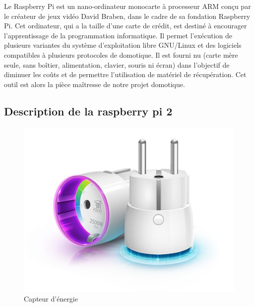 Le Raspberry Pi est un nano-ordinateur monocarte à processeur ARM conçu par le créateur de jeux vidéo David Braben, dans le cadre de sa fondation Raspberry Pi. Cet ordinateur, qui a la taille d'une carte de crédit, est destiné à encourager l'apprentissage de la programmation informatique. Il permet l'exécution de plusieurs variantes du système d'exploitation libre GNU/Linux et des logiciels compatibles à plusieurs protocoles de domotique. Il est fourni nu (carte mère seule, sans boîtier, alimentation, clavier, souris ni écran) dans l'objectif de diminuer les coûts et de permettre l'utilisation de matériel de récupération.
Cet outil est alors la pièce maîtresse de notre projet domotique. 
\subsection{Description de la raspberry pi 2}
\begin{figure}[h]
	\center
	\includegraphics[scale=0.5]{./Images/jpg/WallPlug_FibaroDevice.jpg}
	\caption{Capteur d'énergie}
\end{figure}
